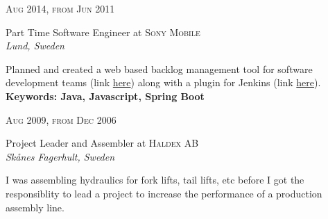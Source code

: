 \documentclass[10pt]{article} %
\begin{document}
{\begin{minipage}[t]{0.44\textwidth}

{\raggedleft\textsc{Aug 2014, from Jun 2011}\par}

{\raggedright\large Part Time Software Engineer at \textsc{Sony Mobile}\\
\textit{Lund, Sweden}\\[5pt]}

\normalsize{Planned and created a web based backlog management tool for software development teams (link \href{https://github.com/sonyxperiadev/BacklogTool}{here}) along with a plugin for Jenkins (link \href{https://github.com/jenkinsci/multi-slave-config-plugin}{here}).} \\ 
\textbf{Keywords: Java, Javascript, Spring Boot }\\


{\raggedleft\textsc{Aug 2009, from Dec 2006}\par}

{\raggedright\large Project Leader and Assembler at \textsc{Haldex AB}\\
\textit{Skånes Fagerhult, Sweden}\\[5pt]}

\normalsize{
  I was assembling hydraulics for fork lifts, tail lifts, etc before I got the responsiblity to lead a project to increase the performance of a production assembly line.
}\\





%
%


\end{minipage}}
\end{document}
